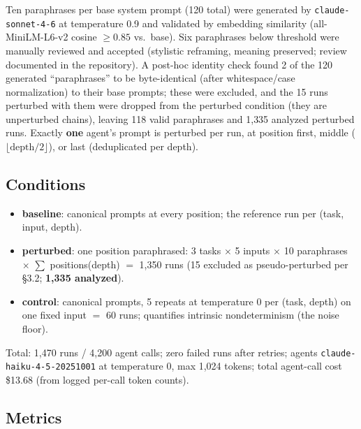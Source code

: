 \documentclass[11pt]{article}
\begin{document}
Ten paraphrases per base system prompt (120 total) were generated by
\texttt{claude-sonnet-4-6} at temperature 0.9 and validated by embedding
similarity (all-MiniLM-L6-v2 cosine $\geq 0.85$ vs.\ base). Six paraphrases
below threshold were manually reviewed and accepted (stylistic reframing,
meaning preserved; review documented in the repository). A post-hoc identity
check found 2 of the 120 generated ``paraphrases'' to be byte-identical
(after whitespace/case normalization) to their base prompts; these were
excluded, and the 15 runs perturbed with them were dropped from the
perturbed condition (they are unperturbed chains), leaving 118 valid
paraphrases and 1{,}335 analyzed perturbed runs. Exactly \textbf{one}
agent's prompt is perturbed per run, at position first, middle
($\lfloor \mathrm{depth}/2 \rfloor$), or last (deduplicated per depth).

\subsection{Conditions}

\begin{itemize}
  \item \textbf{baseline}: canonical prompts at every position; the
  reference run per (task, input, depth).
  \item \textbf{perturbed}: one position paraphrased: 3 tasks $\times$ 5
  inputs $\times$ 10 paraphrases $\times$ $\sum$ positions(depth) $=$
  1{,}350 runs (15 excluded as pseudo-perturbed per \S3.2; \textbf{1{,}335
  analyzed}).
  \item \textbf{control}: canonical prompts, 5 repeats at temperature 0
  per (task, depth) on one fixed input $=$ 60 runs; quantifies intrinsic
  nondeterminism (the noise floor).
\end{itemize}

Total: 1{,}470 runs / 4{,}200 agent calls; zero failed runs after retries;
agents \texttt{claude-haiku-4-5-20251001} at temperature 0, max 1{,}024
tokens; total agent-call cost \$13.68 (from logged per-call token counts).

\subsection{Metrics}
\end{document}
